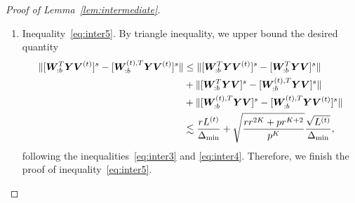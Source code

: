 \documentclass[lettersize,journal]{IEEEtran}
\theoremstyle{definition}
\theoremstyle{definition}
\newcommand{\off}[1]{\left[#1\right]}
\newcommand{\offf}[1]{\left\{#1\right\}}
\begin{document}
\begin{proof}[Proof of Lemma~\ref{lem:intermediate}]
\begin{enumerate}
    \item Inequality~\eqref{eq:inter5}. By triangle inequality, we upper bound the desired quantity 
    \begin{align}
        \lVert [ \bm{W}_{:b}^T \bm Y \bm{V}^{(t)} ]^s   -  [ \bm{W}_{:b}^{(t), T} \bm Y \bm{V}^{(t)} ]^s \rVert &\leq \lVert[ \bm{W}_{:b}^T \bm Y \bm{V}^{(t)} ]^s - [ \bm{W}_{:b}^T \bm Y \bm{V} ]^s \rVert \\
        & + \lVert[\bm{W}_{:b}^T \bm Y \bm{V} ]^s  - [ \bm{W}_{:b}^{(t),T} \bm Y \bm{V} ]^s \rVert \\
        &+ \lVert[\bm{W}_{:b}^{(t),T} \bm Y \bm{V} ]^s  -  [\bm{W}_{:b}^{(t), T} \bm Y \bm{V}^{(t)} ]^s \rVert\\
        &\lesssim \frac{r L^{(t)}}{\Delta_{\min}} + \sqrt{ \frac{rr^{2K} + p r^{K+2}}{p^{K}}}  \frac{\sqrt{L^{(t)}}}{\Delta_{\min}},
    \end{align}
    following the inequalities~\eqref{eq:inter3} and \eqref{eq:inter4}. Therefore, we finish the proof of inequality~\eqref{eq:inter5}.
    \end{enumerate}
    
    \end{proof}
    
\end{document}
